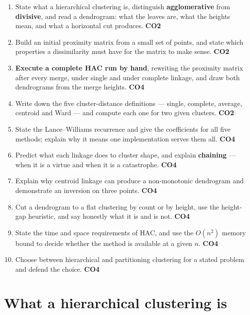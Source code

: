 \documentclass[11pt]{article}
\begin{document}
\begin{enumerate}[leftmargin=*]
  \item State what a hierarchical clustering is, distinguish
    \textbf{agglomerative} from \textbf{divisive}, and read a
    dendrogram: what the leaves are, what the heights mean, and what a
    horizontal cut produces. \hfill \textbf{CO2}
  \item Build an initial proximity matrix from a small set of points, and
    state which properties a dissimilarity must have for the matrix to make
    sense. \hfill \textbf{CO2}
  \item \textbf{Execute a complete HAC run by hand}, rewriting the proximity
    matrix after every merge, under single and under complete linkage, and
    draw both dendrograms from the merge heights. \hfill \textbf{CO4}
  \item Write down the five cluster-distance definitions --- single, complete,
    average, centroid and Ward --- and compute each one for two given
    clusters. \hfill \textbf{CO2}
  \item State the Lance--Williams recurrence and give the coefficients for all
    five methods; explain why it means one implementation serves them
    all. \hfill \textbf{CO4}
  \item Predict what each linkage does to cluster shape, and explain
    \textbf{chaining} --- when it is a virtue and when it is a
    catastrophe. \hfill \textbf{CO4}
  \item Explain why centroid linkage can produce a non-monotonic dendrogram
    and demonstrate an inversion on three points. \hfill \textbf{CO4}
  \item Cut a dendrogram to a flat clustering by count or by height, use the
    height-gap heuristic, and say honestly what it is and is not. \hfill
    \textbf{CO4}
  \item State the time and space requirements of HAC, and use the $O(n^2)$
    memory bound to decide whether the method is available at a given
    $n$. \hfill \textbf{CO4}
  \item Choose between hierarchical and partitioning clustering for a stated
    problem and defend the choice. \hfill \textbf{CO4}
\end{enumerate}

\section{What a hierarchical clustering is}
\label{sec:what}
\end{document}
